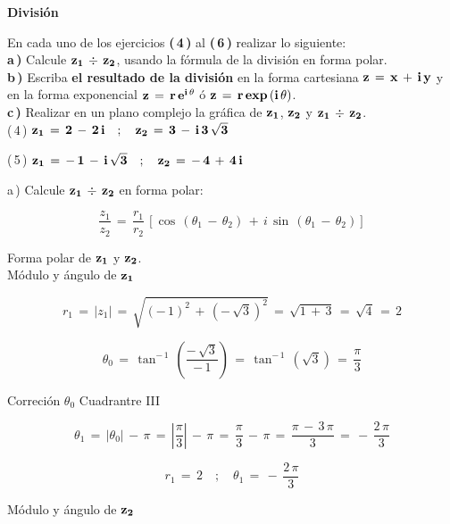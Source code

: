 \documentclass[a4paper,11pt,openany]{book}
\begin{document}
\begin{center}
\textbf{División}
\end{center}

En cada uno de los ejercicios \textbf{(\,4\,)} al \textbf{(\,6\,)} realizar lo siguiente:\\

\textbf{a\,)} Calcule $\bf{z_{1}\,\div\,z_{2}}$, usando la fórmula de la división en forma polar.\\

\textbf{b\,)} Escriba \textbf{el resultado de la división} en la forma cartesiana $\bf{z\,=\,x\,+\,i\,y}$ y en la forma exponencial $\bf{z\,=\,r\,e^{i\,\theta}}$ ó $\bf{z\,=\,r\,exp\,(i\,\theta)}$.\\

\textbf{c\,)} Realizar en un plano complejo la gráfica de $\bf{z_{1}}$, $\bf{z_{2}}$ y $\bf{z_{1}\,\div\,z_{2}}$.\\

\textcolor{ao(english)}{(\,4\,)} $\bf{z_{1}\,=\,2\,-\,2\,i \quad;\quad z_{2}\,=\,3\,-\,i\,3\,\sqrt{3}}$

\textcolor{ao(english)}{(\,5\,)} $\bf{z_{1}\,=\,-\,1\,-\,i\,\sqrt{3} \quad;\quad z_{2}\,=\,-\,4\,+\,4\,i}$

\textcolor{ao(english)}{a\,)} Calcule $\bf{z_{1}\,\div\,z_{2}}$ en forma polar:

$$\dfrac{z_{1}}{z_{2}}\,=\,\dfrac{r_{1}}{r_{2}}\,\left[\cos\,(\theta_{1}\,-\,\theta_{2})\,+\,i\,\sin\,(\theta_{1}\,-\,\theta_{2})\right]$$

\textcolor{ao(english)}{} Forma polar de $\bf{z_{1}}$ y $\bf{z_{2}}$.\\

\textcolor{ao(english)}{} Módulo y ángulo de $\bf{z_{1}}$ 

$$r_{1}\,=\,|z_{1}|\,=\,\sqrt{(-\,1)^{2}\,+\,(-\,\sqrt{3})^{2}}\,=\,\sqrt{1\,+\,3}\,=\,\sqrt{4}\,=\,2$$

$$\theta_{0}\,=\,\tan^{-\,1}\,\left(\dfrac{-\,\sqrt{3}}{-\,1}\right)\,=\,\tan^{-\,1}\,(\sqrt{3})\,=\,\dfrac{\pi}{3}$$

\textcolor{ao(english)}{} Correción $\theta_{0}$ Cuadrantre III

$$\theta_{1}\,=\,|\theta_{0}|\,-\,\pi\,=\,\left|\dfrac{\pi}{3}\right|\,-\,\pi\,=\,\dfrac{\pi}{3}\,-\,\pi\,=\,\dfrac{\pi\,-\,3\,\pi}{3}\,=\,-\,\dfrac{2\,\pi}{3}$$

$$\boxed{r_{1}\,=\,2 \quad;\quad \theta_{1}\,=\,-\,\dfrac{2\,\pi}{3}}$$

\textcolor{ao(english)}{} Módulo y ángulo de $\bf{z_{2}}$ 
\end{document}
